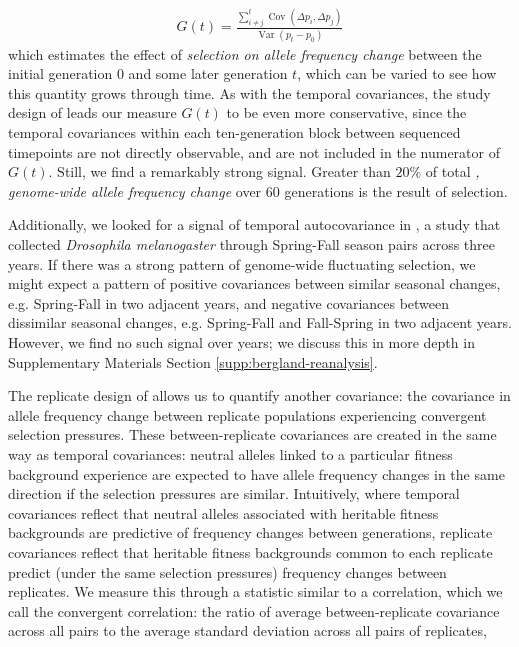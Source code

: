\documentclass[11pt]{article}
\newcommand{\gc}[1]{{\it \color{red} #1 } }
\DeclareMathOperator{\var}{Var}
\DeclareMathOperator{\cov}{Cov}
\begin{document}
\begin{align}
  G(t) = \frac{\sum_{i\ne j}^t \cov(\Delta p_i, \Delta p_j)}{\var(p_t - p_0)}
\end{align}
%
which estimates the effect of \gc{selection on allele frequency
  change} between the initial
generation $0$ and some later generation $t$, which can be varied to see how
this quantity grows through time. As with the temporal covariances, the study
design of \textcite{Barghi2019-qy} leads our measure $G(t)$ to be even more
conservative, since the temporal covariances within each ten-generation block
between sequenced timepoints are not directly observable, and are not included
in the numerator of $G(t)$. Still, we find a remarkably strong signal.
Greater than $20\%$ of total\gc{, genome-wide allele frequency
  change} over 60 %
generations is the result of selection.

Additionally, we looked for a signal of temporal autocovariance in
\textcite{Bergland2014-ij}, a study that collected \emph{Drosophila
melanogaster} through Spring-Fall season pairs across three years. If there was
a strong  pattern of genome-wide fluctuating selection, we might expect a
pattern of positive covariances between similar seasonal changes, e.g.
Spring-Fall in two adjacent years, and negative covariances between dissimilar
seasonal changes, e.g. Spring-Fall and Fall-Spring in two adjacent years.
However, we find no such signal over years; we discuss this in more depth in
Supplementary Materials Section \ref{supp:bergland-reanalysis}.

The replicate design of \textcite{Barghi2019-qy} allows us to quantify another
covariance: the covariance in allele frequency change between replicate
populations experiencing convergent selection pressures. These
between-replicate covariances are created in the same way as temporal
covariances: neutral alleles linked to a particular fitness background
experience are expected to have allele frequency changes in the same direction
if the selection pressures are similar. Intuitively, where temporal covariances
reflect that neutral alleles associated with heritable fitness backgrounds are
predictive of frequency changes between generations, replicate covariances
reflect that heritable fitness backgrounds common to each replicate predict
(under the same selection pressures) frequency changes between replicates. We
measure this through a statistic similar to a correlation, which we call the
convergent correlation: the ratio of average between-replicate covariance
across all pairs to the average standard deviation across all pairs of
replicates, 
\end{document}
